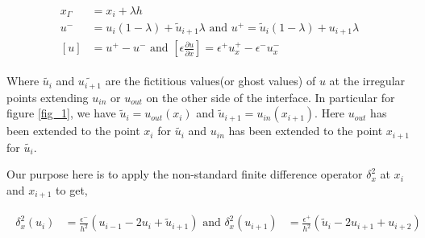 


\begin{eqnarray}
\begin{aligned}
x_\Gamma &= x_i + \lambda h  \\
u^- &= u_i(1-\lambda )+ \tilde{u}_{i+1} \lambda \text{ and }u^+ = \tilde{u}_i(1-\lambda )+ u_{i+1} \lambda\\
\left[u\right]  & = u^+-u^- \text{ and }\left[ \epsilon \frac{\partial u}{\partial x} \right] =  \epsilon^+ u^+_x-\epsilon^- u^-_x
\end{aligned}\label{1d_GFM}
\end{eqnarray}
	
Where $\tilde{u_i}$ and $\tilde{u_{i+1}}$ are the fictitious values(or ghost values) of $u$ at the irregular points extending $u_{in}$ or $u_{out}$ on the other side of the interface. In particular for figure \ref{fig_1},  we have $\tilde{u}_i=u_{out}(x_i)$ and $\tilde{u}_{i+1}=u_{in}(x_{i+1})$. Here $u_{out}$ has been extended to the point $x_i$ for $\tilde{u_i}$ and $u_{in}$ has been extended to the point $x_{i+1}$ for $\tilde{u_i}$. 

Our purpose here is to apply the non-standard finite difference operator $\delta_x^2$ at $x_i$ and $x_{i+1}$ to get, 

\begin{eqnarray}
	\begin{aligned}
		\delta_x^2\left(u_{i}\right)&= \frac{\epsilon^-}{h^2} \left(u_{i-1}-2u_{i}+\tilde{u}_{i+1}\right)\text{ and }\delta_x^2\left(u_{i+1}\right)&= \frac{\epsilon^+}{h^2} \left(\tilde{u}_{i}-2u_{i+1}+u_{i+2}\right)
	\end{aligned}\label{fnt-op}
\end{eqnarray}

